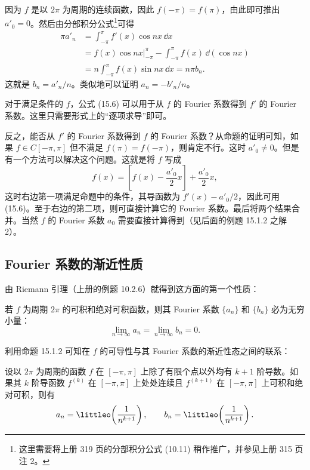 \begin{xproof}
因为 $f$ 是以 $2\pi$ 为周期的连续函数，因此 $f(-\pi)=f(\pi)$，由此即可推出 $a'_0=0$。然后由分部积分公式\footnote{这里需要将上册 319 页的分部积分公式 (10.11) 稍作推广，并参见上册 315 页注 2。}可得
\begin{align*}
  \pi a'_n
  &=\int_{-\pi}^{\pi}f'(x)\cos nx\,\dd x\\
  &=\left.f(x)\cos nx\right|_{-\pi}^{\pi}
    -\int_{-\pi}^{\pi}f(x)\,\dd(\cos nx)\\
  &=n\int_{-\pi}^{\pi}f(x)\sin nx\,\dd x
   =n\pi b_n.
\end{align*}
这就是 $b_n=a'_n/n$。类似地可以证明 $a_n=-b'_n/n$。
\end{xproof}

\begin{xremark}
对于满足条件的 $f$，公式 (15.6) 可以用于从 $f$ 的 Fourier 系数得到 $f'$ 的 Fourier 系数。这里只需要形式上的“逐项求导”即可。

反之，能否从 $f'$ 的 Fourier 系数得到 $f$ 的 Fourier 系数？从命题的证明可知，如果 $f\in C[-\pi,\pi]$ 但不满足 $f(\pi)=f(-\pi)$，则肯定不行。这时 $a'_0\ne0$。但是有一个方法可以解决这个问题。这就是将 $f$ 写成
\begin{equation}
  f(x)=\left[f(x)-\frac{a'_0}{2}x\right]+\frac{a'_0}{2}x,
  \tag{15.7}
  \label{eq:15.7}
\end{equation}
这时右边第一项满足命题中的条件，其导函数为 $f'(x)-a'_0/2$，因此可用 (15.6)。至于右边的第二项，则可直接计算它的 Fourier 系数。最后将两个结果合并。当然 $f$ 的 Fourier 系数 $a_0$ 需要直接计算得到（见后面的例题 15.1.2 之解 2）。
\end{xremark}

\subsection{Fourier 系数的渐近性质}

由 Riemann 引理（上册的例题 10.2.6）就得到这方面的第一个性质：

\begin{xproposition}[15.1.3]
若 $f$ 为周期 $2\pi$ 的可积和绝对可积函数，则其 Fourier 系数 $\{a_n\}$ 和 $\{b_n\}$ 必为无穷小量：
\[
  \lim_{n\to\infty}a_n=\lim_{n\to\infty}b_n=0.
\]
\end{xproposition}

利用命题 15.1.2 可知在 $f$ 的可导性与其 Fourier 系数的渐近性态之间的联系：

\begin{xproposition}[15.1.4]
设以 $2\pi$ 为周期的函数 $f$ 在 $[-\pi,\pi]$ 上除了有限个点以外均有 $k+1$ 阶导数。如果其 $k$ 阶导函数 $f^{(k)}$ 在 $[-\pi,\pi]$ 上处处连续且 $f^{(k+1)}$ 在 $[-\pi,\pi]$ 上可积和绝对可积，则有
\[
  a_n=\littleo\!\left(\frac1{n^{k+1}}\right),\qquad
  b_n=\littleo\!\left(\frac1{n^{k+1}}\right).
\]
\end{xproposition}

